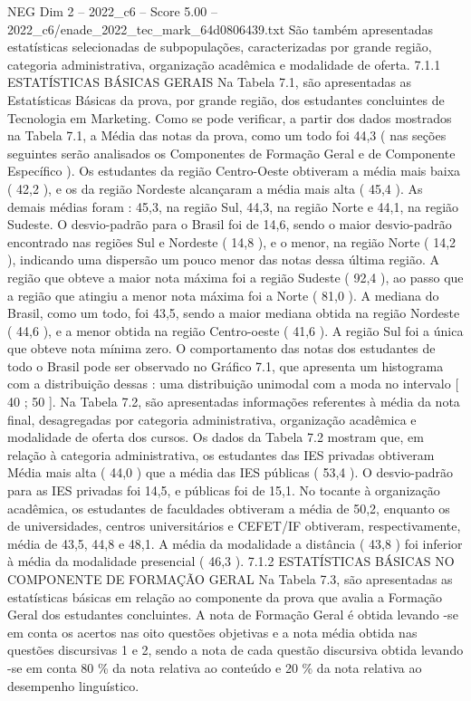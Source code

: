 \begin{textsample}{NEG Dim 2 – 2022\_c6 – Score 5.00 – 2022\_c6/enade\_2022\_tec\_mark\_64d0806439.txt}
São também apresentadas estatísticas selecionadas de subpopulações, caracterizadas por grande região, categoria administrativa, organização acadêmica e modalidade de oferta. 7.1.1 ESTATÍSTICAS BÁSICAS GERAIS Na Tabela 7.1, são apresentadas as Estatísticas Básicas da prova, por grande região, dos estudantes concluintes de Tecnologia em Marketing.
Como se pode verificar, a partir dos dados mostrados na Tabela 7.1, a Média das notas da prova, como um todo foi 44,3 ( nas seções seguintes serão analisados os Componentes de Formação Geral e de Componente Específico ).
Os estudantes da região Centro-Oeste obtiveram a média mais baixa ( 42,2 ), e os da região Nordeste alcançaram a média mais alta ( 45,4 ).
As demais médias foram : 45,3, na região Sul, 44,3, na região Norte e 44,1, na região Sudeste.
O desvio-padrão para o Brasil foi de 14,6, sendo o maior desvio-padrão encontrado nas regiões Sul e Nordeste ( 14,8 ), e o menor, na região Norte ( 14,2 ), indicando uma dispersão um pouco menor das notas dessa última região.
A região que obteve a maior nota máxima foi a região Sudeste ( 92,4 ), ao passo que a região que atingiu a menor nota máxima foi a Norte ( 81,0 ).
A mediana do Brasil, como um todo, foi 43,5, sendo a maior mediana obtida na região Nordeste ( 44,6 ), e a menor obtida na região Centro-oeste ( 41,6 ).
A região Sul foi a única que obteve nota mínima zero.
O comportamento das notas dos estudantes de todo o Brasil pode ser observado no Gráfico 7.1, que apresenta um histograma com a distribuição dessas : uma distribuição unimodal com a moda no intervalo [ 40 ; 50 ].
Na Tabela 7.2, são apresentadas informações referentes à média da nota final, desagregadas por categoria administrativa, organização acadêmica e modalidade de oferta dos cursos.
Os dados da Tabela 7.2 mostram que, em relação à categoria administrativa, os estudantes das IES privadas obtiveram Média mais alta ( 44,0 ) que a média das IES públicas ( 53,4 ).
O desvio-padrão para as IES privadas foi 14,5, e públicas foi de 15,1.
No tocante à organização acadêmica, os estudantes de faculdades obtiveram a média de 50,2, enquanto os de universidades, centros universitários e CEFET/IF obtiveram, respectivamente, média de 43,5, 44,8 e 48,1.
A média da modalidade a distância ( 43,8 ) foi inferior à média da modalidade presencial ( 46,3 ). 7.1.2 ESTATÍSTICAS BÁSICAS NO COMPONENTE DE FORMAÇÃO GERAL Na Tabela 7.3, são apresentadas as estatísticas básicas em relação ao componente da prova que avalia a Formação Geral dos estudantes concluintes.
A nota de Formação Geral é obtida levando -se em conta os acertos nas oito questões objetivas e a nota média obtida nas questões discursivas 1 e 2, sendo a nota de cada questão discursiva obtida levando -se em conta 80 \% da nota relativa ao conteúdo e 20 \% da nota relativa ao desempenho linguístico.

\end{textsample}

